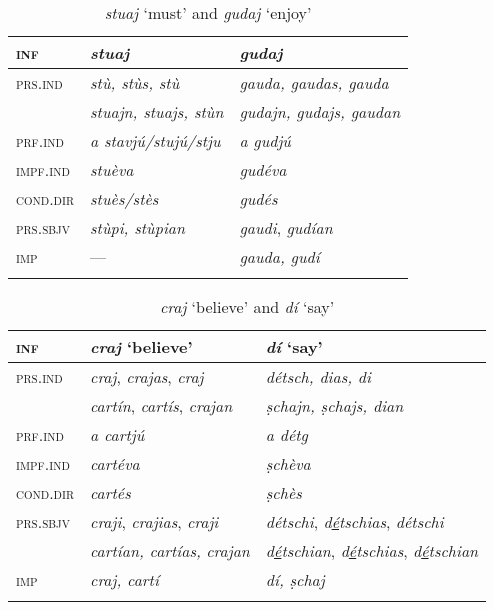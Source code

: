 \begin{table}
	\caption{\textit{stuaj} `must' and \textit{gudaj} `enjoy'}
	\label{}
	\begin{tabular}{lll}
		\lsptoprule
		\textsc{inf} & \textit{\textbf{stuaj}} & \textbf{\textit{gudaj}}\\
		\midrule
		\textsc{prs.ind} & \textit{stù, stùs, stù} & \textit{gauda, gaudas, gauda}\\
		& \textit{stuajn, stuajs, stùn} & \textit{gudajn, gudajs, gaudan}\\
		\textsc{prf.ind} & \textit{a stavjú/stujú/stju} & \textit{a gudjú}\\
		\textsc{impf.ind} & \textit{stuèva} & \textit{gudéva}\\
		\textsc{cond.dir} & \textit{stuès/stès} & \textit{gudés}\\
		\textsc{prs.sbjv} & \textit{stùpi, stùpian} & \textit{gaudi}, \textit{gudían}\\
		\textsc{imp} & --- & \textit{gauda, gudí}\\
		\lspbottomrule
	\end{tabular}
\end{table}


\begin{table}
	\caption{\textit{craj} `believe' and \textit{dí} `say'}
	\label{}
	\begin{tabular}{lll}
		\lsptoprule
		\textsc{inf} & \textit{\textbf{craj}} `believe' & \textit{\textbf{dí}} `say'\\
		\midrule
		\textsc{prs.ind} & \textit{craj}, \textit{crajas}, \textit{craj} & \textit{détsch, dias, di}\\
		& \textit{cartín}, \textit{cartís}, \textit{crajan} & \textit{ṣchajn, ṣchajs, dian}\\
		\textsc{prf.ind} & \textit{a cartjú} & \textit{a détg}\\
		\textsc{impf.ind} & \textit{cartéva} & \textit{ṣchèva} \\
		\textsc{cond.dir} & \textit{cartés} & \textit{ṣchès}\\
		\textsc{prs.sbjv} & \textit{craji}, \textit{crajias}, \textit{craji} & \textit{détschi}, \textit{d\underline{é}tschias}, \textit{détschi}\\
		&\textit{cartían, cartías,} \textit{crajan} & \textit{d\underline{é}tschian}, \textit{d\underline{é}tschias}, \textit{d\underline{é}tschian}\\
		\textsc{imp} & \textit{craj, cartí} & \textit{dí, ṣchaj}\\
		\lspbottomrule
	\end{tabular}
\end{table}


